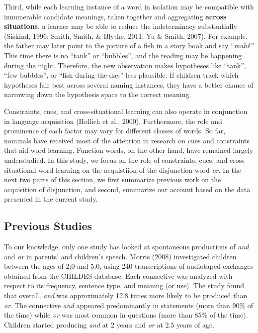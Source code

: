 \documentclass[,man,floatsintext]{apa6}
\begin{document}
Third, while each learning instance of a word in isolation may be compatible with innumerable candidate meanings, taken together and aggregating \textbf{across situations}, a learner may be able to reduce the indeterminacy substantially (Siskind, 1996; Smith, Smith, \& Blythe, 2011; Yu \& Smith, 2007). For example, the father may later point to the picture of a fish in a story book and say \enquote{\emph{mahi}!} This time there is no \enquote{tank} or \enquote{bubbles}, and the reading may be happening during the night. Therefore, the new observation makes hypotheses like \enquote{tank}, \enquote{few bubbles}, or \enquote{fish-during-the-day} less plausible. If children track which hypotheses fair best across several naming instances, they have a better chance of narrowing down the hypothesis space to the correct meaning.

Constraints, cues, and cross-situational learning can also operate in conjunction in language acquisition (Hollich et al., 2000). Furthermore, the role and prominence of each factor may vary for different classes of words. So far, nominals have received most of the attention in research on cues and constraints that aid word learning. Function words, on the other hand, have remained largely understudied. In this study, we focus on the role of constraints, cues, and cross-situational word learning on the acquistiion of the disjunction word \emph{or}. In the next two parts of this section, we first summarize previous work on the acquisition of disjunction, and second, summarize our account based on the data presented in the current study.

\hypertarget{previous-studies}{%
\subsection{Previous Studies}\label{previous-studies}}

To our knowledge, only one study has looked at spontaneous productions of \emph{and} and \emph{or} in parents' and children's speech. Morris (2008) investigated children between the ages of 2;0 and 5;0, using 240 transcriptions of audiotaped exchanges obtained from the CHILDES database. Each connective was analyzed with respect to its frequency, sentence type, and meaning (or use). The study found that overall, \emph{and} was approximately 12.8 times more likely to be produced than \emph{or}. The connective \emph{and} appeared predominantly in statements (more than 90\% of the time) while \emph{or} was most common in questions (more than 85\% of the time). Children started producing \emph{and} at 2 years and \emph{or} at 2.5 years of age.
\end{document}
